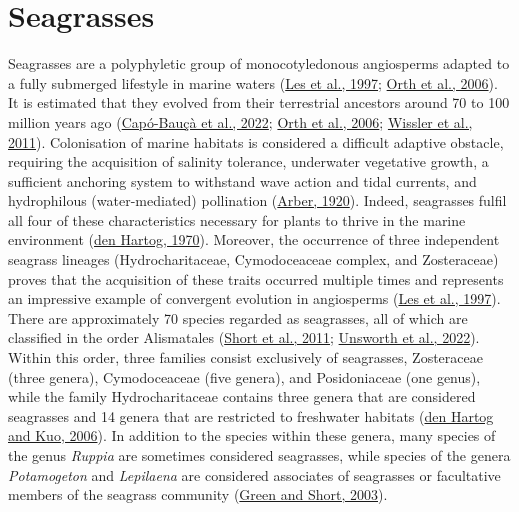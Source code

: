 \documentclass[
  12 pt,
]{book}
\begin{document}
\hypertarget{section-seagrasses}{%
\section{Seagrasses}\label{section-seagrasses}}

Seagrasses are a polyphyletic group of monocotyledonous angiosperms adapted to a fully submerged lifestyle in marine waters (\protect\hyperlink{ref-Les1997}{Les et al., 1997}; \protect\hyperlink{ref-Orth2006}{Orth et al., 2006}). It is estimated that they evolved from their terrestrial ancestors around 70 to 100 million years ago (\protect\hyperlink{ref-Capo-Bauca2022}{Capó-Bauçà et al., 2022}; \protect\hyperlink{ref-Orth2006}{Orth et al., 2006}; \protect\hyperlink{ref-Wissler2011}{Wissler et al., 2011}). Colonisation of marine habitats is considered a difficult adaptive obstacle, requiring the acquisition of salinity tolerance, underwater vegetative growth, a sufficient anchoring system to withstand wave action and tidal currents, and hydrophilous (water-mediated) pollination (\protect\hyperlink{ref-Arber1920}{Arber, 1920}). Indeed, seagrasses fulfil all four of these characteristics necessary for plants to thrive in the marine environment (\protect\hyperlink{ref-denHartog1970}{den Hartog, 1970}). Moreover, the occurrence of three independent seagrass lineages (Hydrocharitaceae, Cymodoceaceae complex, and Zosteraceae) proves that the acquisition of these traits occurred multiple times and represents an impressive example of convergent evolution in angiosperms (\protect\hyperlink{ref-Les1997}{Les et al., 1997}). There are approximately 70 species regarded as seagrasses, all of which are classified in the order Alismatales (\protect\hyperlink{ref-Short2011}{Short et al., 2011}; \protect\hyperlink{ref-Unsworth2022}{Unsworth et al., 2022}). Within this order, three families consist exclusively of seagrasses, Zosteraceae (three genera), Cymodoceaceae (five genera), and Posidoniaceae (one genus), while the family Hydrocharitaceae contains three genera that are considered seagrasses and 14 genera that are restricted to freshwater habitats (\protect\hyperlink{ref-denHartog2006}{den Hartog and Kuo, 2006}). In addition to the species within these genera, many species of the genus \emph{Ruppia} are sometimes considered seagrasses, while species of the genera \emph{Potamogeton} and \emph{Lepilaena} are considered associates of seagrasses or facultative members of the seagrass community (\protect\hyperlink{ref-Green2003}{Green and Short, 2003}).
\end{document}
